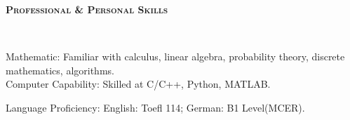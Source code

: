 \documentclass[a4paper]{article}
\newenvironment{changemargin}[2]{%
  \begin{list}{}{%
    \setlength{\topsep}{0pt}%
    \setlength{\leftmargin}{#1}%
    \setlength{\rightmargin}{#2}%
    \setlength{\listparindent}{\parindent}%
    \setlength{\itemindent}{\parindent}%
    \setlength{\parsep}{\parskip}%
  }%
  \item[]}{\end{list}
}
\newcommand{\lineover}{
	\begin{changemargin}{-0.05in}{-0.05in}
		\vspace*{-8pt}
		\hrulefill \\
		\vspace*{-2pt}
	\end{changemargin}
}
\newcommand{\header}[1]{
	\begin{changemargin}{-0.5in}{-0.5in}
		\scshape{\textbf{#1}}\\
  	\lineover
	\end{changemargin}
}
\newenvironment{body} {
	\vspace*{-16pt}
	\begin{changemargin}{-0.5in}{-0.5in}
  }	
	{\end{changemargin}
}
\begin{document}
\begin{body}

\end{body}
\smallskip
\smallskip


\header{Professional \& Personal Skills}

\begin{body}
	\vspace{14pt}
	Mathematic: Familiar with calculus, linear algebra, probability theory, discrete mathematics, algorithms.\\
	\smallskip
	Computer Capability: Skilled at C/C++, Python, MATLAB.\\
	\smallskip

	Language Proficiency: English: Toefl 114; German: B1 Level(MCER).\\
\end{body}
\smallskip
\smallskip






\end{document}
